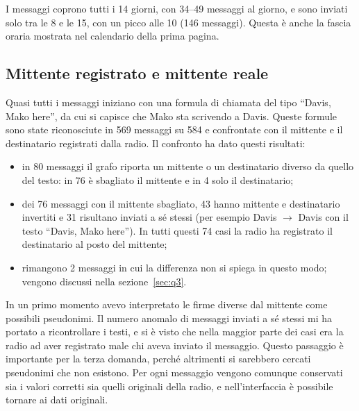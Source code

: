 \documentclass[11pt,a4paper]{article}
\begin{document}
I messaggi coprono tutti i 14 giorni, con 34--49 messaggi al giorno, e sono inviati solo tra le 8 e le 15,
con un picco alle 10 (146 messaggi). Questa è anche la fascia oraria mostrata nel calendario della prima
pagina.

\subsection{Mittente registrato e mittente reale}\label{sec:mittenti}
Quasi tutti i messaggi iniziano con una formula di chiamata del tipo ``Davis, Mako here'', da cui si capisce
che Mako sta scrivendo a Davis. Queste formule sono state riconosciute in 569 messaggi su 584 e confrontate con
il mittente e il destinatario registrati dalla radio. Il confronto ha dato questi risultati:
\begin{itemize}
  \item in 80 messaggi il grafo riporta un mittente o un destinatario diverso da quello del testo: in 76 è
        sbagliato il mittente e in 4 solo il destinatario;
  \item dei 76 messaggi con il mittente sbagliato, 43 hanno mittente e destinatario invertiti e 31 risultano
        inviati a sé stessi (per esempio Davis $\rightarrow$ Davis con il testo ``Davis, Mako here''). In tutti
        questi 74 casi la radio ha registrato il destinatario al posto del mittente;
  \item rimangono 2 messaggi in cui la differenza non si spiega in questo modo; vengono discussi nella
        sezione~\ref{sec:q3}.
\end{itemize}
In un primo momento avevo interpretato le firme diverse dal mittente come possibili pseudonimi. Il numero
anomalo di messaggi inviati a sé stessi mi ha portato a ricontrollare i testi, e si è visto che nella
maggior parte dei casi era la radio ad aver registrato male chi aveva inviato il messaggio. Questo passaggio è importante per la terza domanda, perché altrimenti si sarebbero
cercati pseudonimi che non esistono. Per ogni messaggio vengono comunque conservati sia i valori corretti
sia quelli originali della radio, e nell'interfaccia è possibile tornare ai dati originali.
\end{document}
